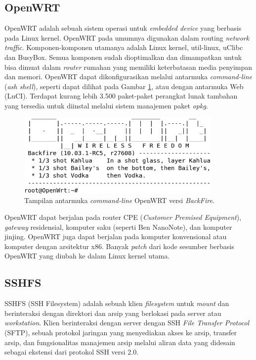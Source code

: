   \subsection{OpenWRT}
    OpenWRT adalah sebuah sistem operasi untuk \emph{embedded device} yang berbasis pada Linux kernel. OpenWRT pada umumnya digunakan dalam routing \emph{network traffic}. Komponen-komponen utamanya adalah Linux kernel, util-linux, uClibc dan BusyBox. Semua komponen sudah dioptimalkan dan dimampatkan untuk bisa dimuat dalam \emph{router} rumahan yang memiliki keterbatasan media penyimpan dan memori. OpenWRT dapat dikonfigurasikan melalui antarmuka \emph{command-line} (\emph{ash shell}), seperti dapat dilihat pada Gambar \ref{openwrt}, atau dengan antarmuka Web (LuCI). Terdapat kurang lebih 3.500 paket-paket perangkat lunak tambahan yang tersedia untuk diinstal melalui sistem manajemen paket \emph{opkg}.

      \begin{figure}[ht!]
        \centering
          \includegraphics[width=10cm]{gambar/openwrt}
          \caption{Tampilan antarmuka \emph{command-line} OpenWRT versi \emph{BackFire}.}
          \label{openwrt}
      \end{figure}

    OpenWRT dapat berjalan pada router CPE (\emph{Customer Premised Equipment}), \emph{gateway} residensial, komputer saku (seperti Ben NanoNote), dan komputer jinjing. OpenWRT juga dapat berjalan pada komputer konvensional atau komputer dengan arsitektur x86. Banyak \emph{patch} dari kode sesumber berbasis OpenWRT yang diubah ke dalam Linux kernel utama.

  \subsection{SSHFS}
    SSHFS (SSH Filesystem) adalah sebuah klien \emph{filesystem} untuk \emph{mount} dan berinteraksi dengan direktori dan arsip yang berlokasi pada server atau \emph{workstation}. Klien berinteraksi dengan server dengan SSH \emph{File Transfer Protocol} (SFTP), sebuah protokol jaringan yang menyediakan akses ke arsip, transfer arsip, dan fungsionalitas manajemen arsip melalui aliran data yang didesain sebagai ekstensi dari protokol SSH versi 2.0.

